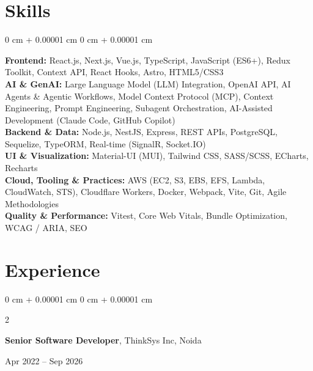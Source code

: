 \documentclass[10pt, letterpaper]{article}
\newenvironment{onecolentry}{
    \begin{adjustwidth}{
        0 cm + 0.00001 cm
    }{
        0 cm + 0.00001 cm
    }
}{
    \end{adjustwidth}
}
\newenvironment{twocolentry}[2][]{
    \onecolentry
    \def\secondColumn{#2}
    \setcolumnwidth{\fill, 4.5 cm}
    \begin{paracol}{2}
}{
    \switchcolumn \raggedleft \secondColumn
    \end{paracol}
    \endonecolentry
}
\begin{document}
    \section{Skills}
    \begin{onecolentry}
        \textbf{Frontend:} React.js, Next.js, Vue.js, TypeScript, JavaScript (ES6+), Redux Toolkit, Context API, React Hooks, Astro, HTML5/CSS3\\[4pt]
        \textbf{AI \& GenAI:} Large Language Model (LLM) Integration, OpenAI API, AI Agents \& Agentic Workflows, Model Context Protocol (MCP), Context Engineering, Prompt Engineering, Subagent Orchestration, AI-Assisted Development (Claude Code, GitHub Copilot)\\[4pt]
        \textbf{Backend \& Data:} Node.js, NestJS, Express, REST APIs, PostgreSQL, Sequelize, TypeORM, Real-time (SignalR, Socket.IO)\\[4pt]
        \textbf{UI \& Visualization:} Material-UI (MUI), Tailwind CSS, SASS/SCSS, ECharts, Recharts\\[4pt]
        \textbf{Cloud, Tooling \& Practices:} AWS (EC2, S3, EBS, EFS, Lambda, CloudWatch, STS), Cloudflare Workers, Docker, Webpack, Vite, Git, Agile Methodologies\\[4pt]
        \textbf{Quality \& Performance:} Vitest, Core Web Vitals, Bundle Optimization, WCAG / ARIA, SEO
    \end{onecolentry}

    \section{Experience}

    \begin{twocolentry}{Apr 2022 -- Sep 2026}
        \textbf{Senior Software Developer}, ThinkSys Inc, Noida
    \end{twocolentry}

    \vspace{0.20 cm}
\end{document}
